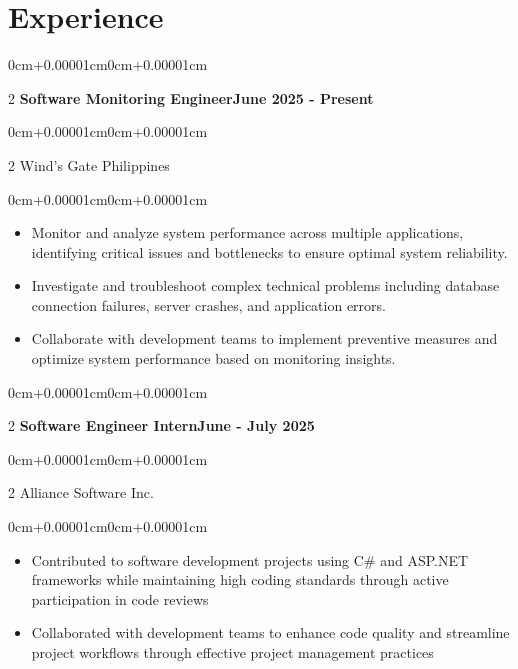 \documentclass[11pt, letterpaper]{article}
\newenvironment{highlights}{\begin{itemize}[topsep=0.08cm,parsep=0.08cm,partopsep=0pt,itemsep=0pt,leftmargin=0cm+10pt]}{\end{itemize}}
\newenvironment{onecolentry}{\begin{adjustwidth}{0cm+0.00001cm}{0cm+0.00001cm}}{\end{adjustwidth}}
\newenvironment{twocolentry}[2][]{\onecolentry\def\secondColumn{#2}\setcolumnwidth{\fill,5.2cm}\begin{paracol}{2}}{\switchcolumn \raggedleft \secondColumn\end{paracol}\endonecolentry}
\begin{document}
\section{Experience}

    \begin{twocolentry}{\textbf{June 2025 - Present}}
    \textbf{Software Monitoring Engineer}\end{twocolentry}
    \vspace{0.05cm}
    \begin{twocolentry}{}
    Wind's Gate Philippines\end{twocolentry}
    \vspace{0.10cm}
    \begin{onecolentry}
        \begin{highlights}
            \item Monitor and analyze system performance across multiple applications, identifying critical issues and bottlenecks to ensure optimal system reliability.
            \item Investigate and troubleshoot complex technical problems including database connection failures, server crashes, and application errors.
            \item Collaborate with development teams to implement preventive measures and optimize system performance based on monitoring insights.
        \end{highlights}
    \end{onecolentry}
    \vspace{0.15cm}

    \begin{twocolentry}{\textbf{June - July 2025}}
    \textbf{Software Engineer Intern}\end{twocolentry}
    \vspace{0.05cm}
    \begin{twocolentry}{}
    Alliance Software Inc.\end{twocolentry}
    \vspace{0.10cm}
    \begin{onecolentry}
        \begin{highlights}
            \item Contributed to software development projects using C\# and ASP.NET frameworks while maintaining high coding standards through active participation in code reviews
            \item Collaborated with development teams to enhance code quality and streamline project workflows through effective project management practices
        \end{highlights}
    \end{onecolentry}
    \vspace{0.15cm}
\end{document}
